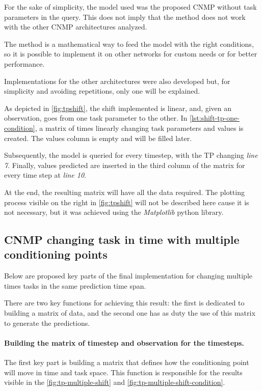 For the sake of simplicity, the model used was the proposed CNMP without task parameters in the query. This does not imply that the method does not work with the other CNMP architectures analyzed. 

The method is a mathematical way to feed the model with the right conditions, so it is possible to implement it on other networks for custom needs or for better performance.

Implementations for the other architectures were also developed but, for simplicity and avoiding repetitions, only one will be explained. 

As depicted in \cref{fig:tpshift}, the shift implemented is linear, and, given an observation, goes from one task parameter to the other. In \cref{lst:shift-tp-one-condition}, a matrix of times linearly changing task parameters and values is created. The values column is empty and will be filled later.

Subsequently, the model is queried for every timestep, with the TP changing \emph{line 7}. 
Finally, values predicted are inserted in the third column of the matrix for every time step at \emph{line 10}. 

At the end, the resulting matrix will have all the data required. The plotting process visible on the right in \cref{fig:tpshift} will not be described here cause it is not necessary, but it was achieved using the \emph{Matplotlib} python library.  




\subsection{CNMP changing task in time with multiple conditioning points}
Below are proposed key parts of the final implementation for changing multiple times tasks in the same prediction time span.

There are two key functions for achieving this result: the first is dedicated to building a matrix of data, and the second one has as duty the use of this matrix to generate the predictions. 

\paragraph{Building the matrix of timestep and observation for the timesteps. }
The first key part is building a matrix that defines how the conditioning point will move in time and task space. This function is responsible for the results visible in the \cref{fig:tp-multiple-shift} and \cref{fig:tp-multiple-shift-condition}. 

